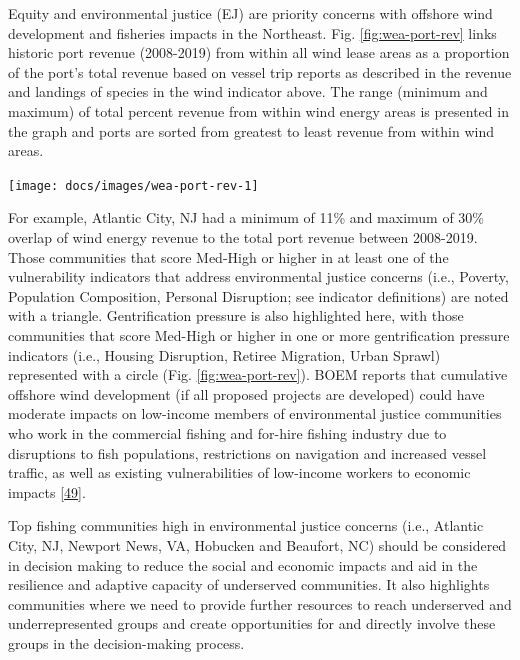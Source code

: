 \documentclass[
  10pt,
]{article}
\let\origfigure\figure
\let\endorigfigure\endfigure
\renewenvironment{figure}[1][2] {
    \expandafter\origfigure\expandafter[H]
} {
    \endorigfigure
}
\begin{document}
Equity and environmental justice (EJ) are priority concerns with
offshore wind development and fisheries impacts in the Northeast. Fig.
\ref{fig:wea-port-rev} links historic port revenue (2008-2019) from
within all wind lease areas as a proportion of the port's total revenue
based on vessel trip reports as described in the revenue and landings of
species in the wind indicator above. The range (minimum and maximum) of
total percent revenue from within wind energy areas is presented in the
graph and ports are sorted from greatest to least revenue from within
wind areas.

\begin{figure}

\texttt{[image: docs/images/wea-port-rev-1]} \hfill{}

\caption{Percent of port revenue from Wind Energy Areas (WEA) in descending order from most to least port revenue from WEA. EJ = Environmental Justice.}\label{fig:wea-port-rev}
\end{figure}

For example, Atlantic City, NJ had a minimum of 11\% and maximum of 30\%
overlap of wind energy revenue to the total port revenue between
2008-2019. Those communities that score Med-High or higher in at least
one of the vulnerability indicators that address environmental justice
concerns (i.e., Poverty, Population Composition, Personal Disruption;
see indicator definitions) are noted with a triangle. Gentrification
pressure is also highlighted here, with those communities that score
Med-High or higher in one or more gentrification pressure indicators
(i.e., Housing Disruption, Retiree Migration, Urban Sprawl) represented
with a circle (Fig. \ref{fig:wea-port-rev}). BOEM reports that
cumulative offshore wind development (if all proposed projects are
developed) could have moderate impacts on low-income members of
environmental justice communities who work in the commercial fishing and
for-hire fishing industry due to disruptions to fish populations,
restrictions on navigation and increased vessel traffic, as well as
existing vulnerabilities of low-income workers to economic impacts
{[}\protect\hyperlink{ref-boem_vineyard_2020}{49}{]}.

Top fishing communities high in environmental justice concerns (i.e.,
Atlantic City, NJ, Newport News, VA, Hobucken and Beaufort, NC) should
be considered in decision making to reduce the social and economic
impacts and aid in the resilience and adaptive capacity of underserved
communities. It also highlights communities where we need to provide
further resources to reach underserved and underrepresented groups and
create opportunities for and directly involve these groups in the
decision-making process.
\end{document}
